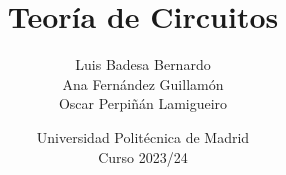 \documentclass[oldfontcommands,a4paper]{memoir}
\begin{document}
\begin{titlingpage}

\title{Teoría de Circuitos}

\author{
  Luis Badesa Bernardo\\
  Ana Fernández Guillamón\\
  Oscar Perpiñán Lamigueiro}

\date{
  Universidad Politécnica de Madrid\\
  Curso 2023/24
}

\maketitle


\end{titlingpage}

\frontmatter



\cleardoublepage{}

\tableofcontents*

\cleardoublepage{}


\mainmatter























\backmatter
\end{document}

